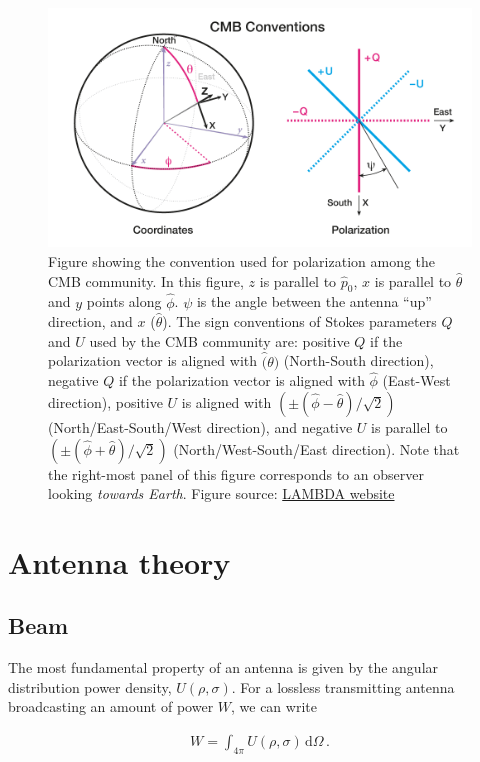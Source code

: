 \documentclass[a4paper,11pt]{article}
\begin{document}
\begin{figure}
	\centering
	\includegraphics[width=0.7\linewidth]{figures/cmb_coord_convention}
	\caption{Figure showing the convention used for polarization among the CMB community. In this figure, $z$ is parallel to $\hat{p}_0$, $x$ is parallel to $\hat{\theta}$ and $y$ points along $\hat{\phi}$. $\psi$ is the angle between the antenna ``up'' direction, and $x$ ($\hat{\theta}$). The sign conventions of Stokes parameters $Q$ and $U$ used by the CMB community are: positive $Q$ if the polarization vector is aligned with $\hat(\theta)$ (North-South direction), negative $Q$ if the polarization vector is aligned with $\hat{\phi}$ (East-West direction), positive $U$ is aligned with $(\pm(\hat{\phi} - \hat{\theta})/\sqrt{2} )$ (North/East-South/West direction), and negative $U$ is parallel to $(\pm(\hat{\phi} + \hat{\theta})/\sqrt{2} )$ (North/West-South/East direction). Note that the right-most panel of this figure corresponds to an observer looking \textsl{towards Earth}. Figure source: \href{https://lambda.gsfc.nasa.gov/product/about/pol_convention.cfm}{LAMBDA website}}
	\label{fig::cmbcoordconvention}
\end{figure}

\section{Antenna theory}
\label{sec::antennas}

\subsection{Beam}

The most fundamental property of an antenna is given by the angular distribution power density, $U(\rho,\sigma)$. For a lossless transmitting antenna broadcasting an amount of power $W$, we can write

\begin{equation}
\begin{aligned}
W = \int_{4\pi} U(\rho,\sigma) \, \mathrm{d} \Omega \, .
\end{aligned}
\end{equation}
\end{document}

